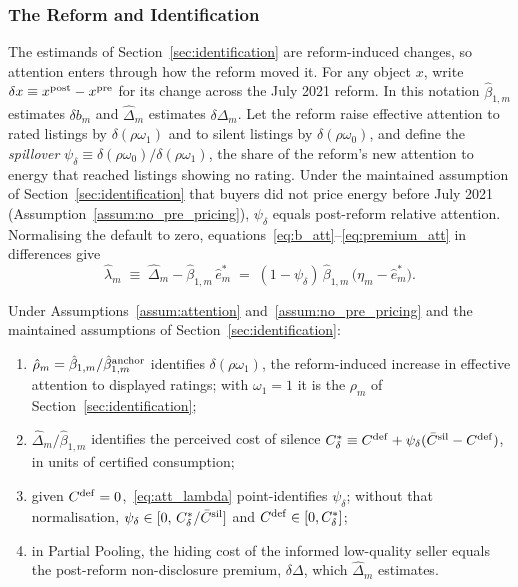 \subsubsection{The Reform and Identification}
\label{ss:att_identification}

The estimands of Section~\ref{sec:identification} are reform-induced changes, so attention enters through how the reform moved it. For any object $x$, write $\delta x\equiv x^{\rm post}-x^{\rm pre}$ for its change across the July 2021 reform. In this notation $\hat\beta_{1,m}$ estimates $\delta b_m$ and $\hat\Delta_m$ estimates $\delta\Delta_m$. Let the reform raise effective attention to rated listings by $\delta(\rho\omega_1)$ and to silent listings by $\delta(\rho\omega_0)$, and define the \emph{spillover} $\psi_\delta\equiv\delta(\rho\omega_0)/\delta(\rho\omega_1)$, the share of the reform's new attention to energy that reached listings showing no rating. Under the maintained assumption of Section~\ref{sec:identification} that buyers did not price energy before July 2021 (Assumption~\ref{assum:no_pre_pricing}), $\psi_\delta$ equals post-reform relative attention. Normalising the default to zero, equations~\eqref{eq:b_att}--\eqref{eq:premium_att} in differences give
\begin{equation}
    \hat\lambda_m\;\equiv\;\hat\Delta_m-\hat\beta_{1,m}\,\hat e^*_m\;=\;(1-\psi_\delta)\,\hat\beta_{1,m}\,\big(\eta_m-\hat e^*_m\big).
    \label{eq:att_lambda}
\end{equation}

\begin{proposition}
\label{prop:att_identification}
Under Assumptions~\ref{assum:attention} and~\ref{assum:no_pre_pricing} and the maintained assumptions of Section~\ref{sec:identification}:
\begin{enumerate}[label=(\roman*)]
    \item $\hat\rho_m=\hat\beta_{1,m}/\hat\beta^{\rm anchor}_{1,m}$ identifies $\delta(\rho\omega_1)$, the reform-induced increase in effective attention to displayed ratings; with $\omega_1=1$ it is the $\rho_m$ of Section~\ref{sec:identification};
    \item $\hat\Delta_m/\hat\beta_{1,m}$ identifies the perceived cost of silence $C^*_\delta\equiv C^{\rm def}+\psi_\delta(\bar C^{\rm sil}-C^{\rm def})$, in units of certified consumption;
    \item given $C^{\rm def}=0$,~\eqref{eq:att_lambda} point-identifies $\psi_\delta$; without that normalisation, $\psi_\delta\in[0,\,C^*_\delta/\bar C^{\rm sil}]$ and $C^{\rm def}\in[0,C^*_\delta]$;
    \item in Partial Pooling, the hiding cost of the informed low-quality seller equals the post-reform non-disclosure premium, $\delta\Delta$, which $\hat\Delta_m$ estimates.
\end{enumerate}
\end{proposition}

